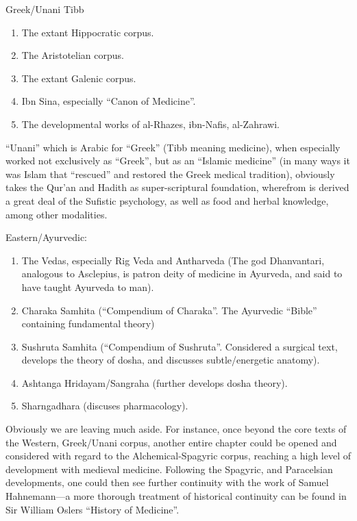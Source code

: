 Greek/Unani Tibb
\begin{enumerate}
\item The extant Hippocratic corpus.

\item The Aristotelian corpus.

\item The extant Galenic corpus.

\item Ibn Sina, especially ``Canon of Medicine''.

\item The developmental works of al-Rhazes, ibn-Nafis, al-Zahrawi.
\end{enumerate}

``Unani'' which is Arabic for ``Greek'' (Tibb meaning medicine), when especially worked not exclusively as ``Greek'', but as an ``Islamic medicine'' (in many ways it was Islam that ``rescued'' and restored the Greek medical tradition), obviously takes the Qur'an and Hadith as super-scriptural foundation, wherefrom is derived a great deal of the Sufistic psychology, as well as food and herbal knowledge, among other modalities.

Eastern/Ayurvedic:
\begin{enumerate}
\item The Vedas, especially Rig Veda and Antharveda (The god Dhanvantari, analogous to Asclepius, is patron deity of medicine in Ayurveda, and said to have taught Ayurveda to man).

\item Charaka Samhita (``Compendium of Charaka''. The Ayurvedic ``Bible'' containing fundamental theory)

\item Sushruta Samhita (``Compendium of Sushruta''. Considered a surgical text, develops the theory of dosha, and discusses subtle/energetic anatomy).

\item Ashtanga Hridayam/Sangraha (further develops dosha theory).

\item Sharngadhara (discuses pharmacology).
\end{enumerate}

Obviously we are leaving much aside. For instance, once beyond the core texts of the Western, Greek/Unani corpus, another entire chapter could be opened and considered with regard to the Alchemical-Spagyric corpus, reaching a high level of development with medieval medicine. Following the Spagyric, and Paracelsian developments, one could then see further continuity with the work of Samuel Hahnemann---a more thorough treatment of historical continuity can be found in Sir William Oslers ``History of Medicine''.

